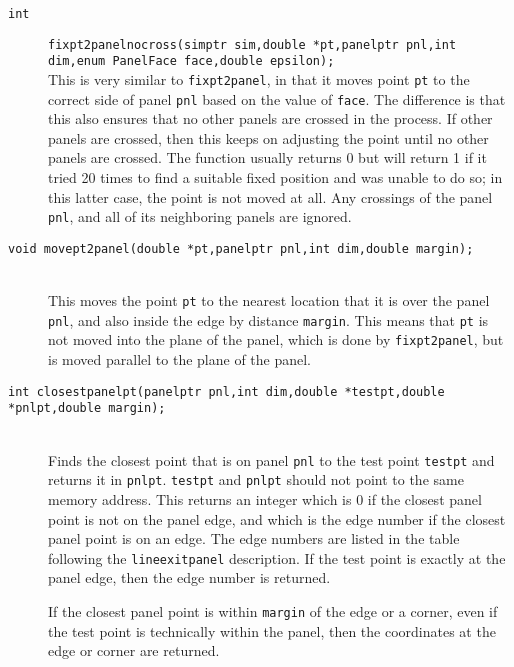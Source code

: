 \documentclass {book}
\begin{document}
\begin{description}
\item[\texttt{int}]
\texttt{fixpt2panelnocross(simptr sim,double *pt,panelptr pnl,int dim,enum PanelFace face,double epsilon);}
\hfill \\
This is very similar to \texttt{fixpt2panel}, in that it moves point \texttt{pt} to the correct side of panel \texttt{pnl} based on the value of \texttt{face}.  The difference is that this also ensures that no other panels are crossed in the process.  If other panels are crossed, then this keeps on adjusting the point until no other panels are crossed.  The function usually returns 0 but will return 1 if it tried 20 times to find a suitable fixed position and was unable to do so; in this latter case, the point is not moved at all.  Any crossings of the panel \texttt{pnl}, and all of its neighboring panels are ignored.

\item[\texttt{void movept2panel(double *pt,panelptr pnl,int dim,double margin);}]
\hfill \\
This moves the point \texttt{pt} to the nearest location that it is over the panel \texttt{pnl}, and also inside the edge by distance \texttt{margin}.  This means that \texttt{pt} is not moved into the plane of the panel, which is done by \texttt{fixpt2panel}, but is moved parallel to the plane of the panel.

\item[\texttt{int closestpanelpt(panelptr pnl,int dim,double *testpt,double *pnlpt,double margin);}]
\hfill \\
Finds the closest point that is on panel \texttt{pnl} to the test point \texttt{testpt} and returns it in \texttt{pnlpt}.  \texttt{testpt} and \texttt{pnlpt} should not point to the same memory address.  This returns an integer which is 0 if the closest panel point is not on the panel edge, and which is the edge number if the closest panel point is on an edge.  The edge numbers are listed in the table following the \texttt{lineexitpanel} description.  If the test point is exactly at the panel edge, then the edge number is returned.

If the closest panel point is within \texttt{margin} of the edge or a corner, even if the test point is technically within the panel, then the coordinates at the edge or corner are returned.


\end{description}
\end{document}
